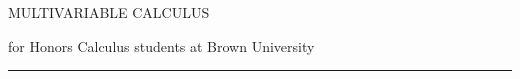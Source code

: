 \begin{titlepage} 
  \pagecolor{softblue}
  {\titlefont \color{MidnightBlue} MULTIVARIABLE CALCULUS} 
  
  \vspace*{5mm} 
  { \hspace*{5.6cm} \subtitlefont for Honors Calculus students at Brown University} \par
  \null\vfill
  \vspace*{1cm}
  \noindent
  \hfill
  \begin{minipage}{0.35\linewidth}
    \begin{flushright}
      \printauthor
    \end{flushright}
  \end{minipage}
  \begin{minipage}{0.02\linewidth}
    \rule{1pt}{125pt}
  \end{minipage}
  \titlepagedecoration
\end{titlepage}